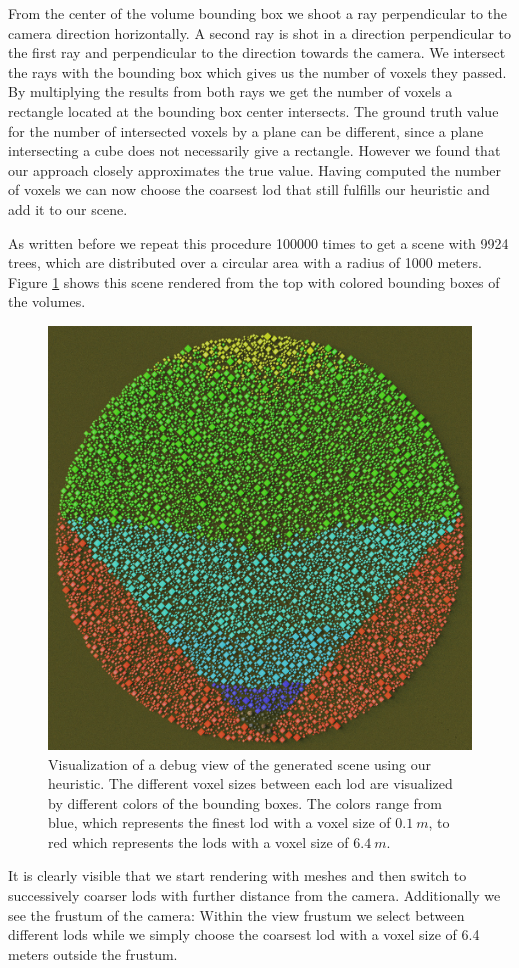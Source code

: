 From the center of the volume bounding box we shoot a ray perpendicular to the camera direction horizontally.
A second ray is shot in a direction perpendicular to the first ray and perpendicular to the direction towards the camera.
We intersect the rays with the bounding box which gives us the number of voxels they passed.
By multiplying the results from both rays we get the number of voxels a rectangle located at the bounding box center intersects.
The ground truth value for the number of intersected voxels by a plane can be different, since a plane intersecting a cube does not necessarily give a rectangle.
However we found that our approach closely approximates the true value.
Having computed the number of voxels we can now choose the coarsest \ac{lod} that still fulfills our heuristic and add it to our scene.

As written before we repeat this procedure 100000 times to get a scene with 9924 trees, which are distributed over a circular area with a radius of 1000 meters.
Figure \ref{fig:visualize_lods} shows this scene rendered from the top with colored bounding boxes of the volumes.
\begin{figure}[ht]
    \centering
    \includegraphics[width=0.5\linewidth]{img/visualize_lods.jpg}
    \caption[Visualization of a \ac{lod} scene]{Visualization of a debug view of the generated scene using our heuristic. The different voxel sizes between each \ac{lod} are visualized by different colors of the bounding boxes. The colors range from blue, which represents the finest \ac{lod} with a voxel size of $\SI{0.1}{m}$, to red which represents the \acsp{lod} with a voxel size of $\SI{6.4}{m}$.}
    \label{fig:visualize_lods}
\end{figure}
It is clearly visible that we start rendering with meshes and then switch to successively coarser \acsp{lod} with further distance from the camera.
Additionally we see the frustum of the camera: Within the view frustum we select between different \acsp{lod} while we simply choose the coarsest \ac{lod} with a voxel size of 6.4 meters outside the frustum.


